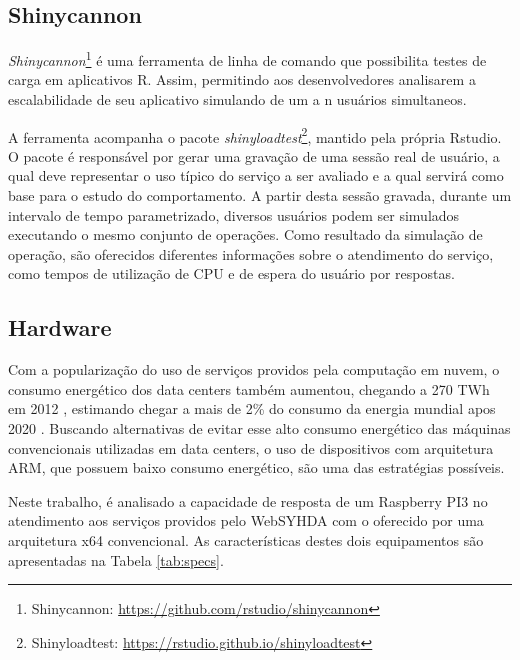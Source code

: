 \documentclass[12pt,english,brazil]{article}
\begin{document}
\subsection{Shinycannon} \label{sec:Shinycannon}

\textit{Shinycannon}\footnote{Shinycannon: \url{https://github.com/rstudio/shinycannon}} é uma ferramenta de linha de comando que possibilita testes de carga em aplicativos R. Assim, permitindo aos desenvolvedores analisarem a escalabilidade de seu aplicativo simulando de um a n usuários simultaneos.

A ferramenta acompanha o pacote \textit{shinyloadtest}\footnote{Shinyloadtest: \url{https://rstudio.github.io/shinyloadtest}}, mantido pela própria Rstudio. O pacote é responsável por gerar uma gravação de uma sessão real de usuário, a qual deve representar o uso típico do serviço a ser avaliado\cite{shinyloadtest} e a qual servirá como base para o estudo do comportamento. A partir desta sessão gravada, durante um intervalo de tempo parametrizado, diversos usuários podem ser simulados executando o mesmo conjunto de operações. Como resultado da simulação de operação, são oferecidos diferentes informações sobre o atendimento do serviço, como tempos de utilização de CPU e de espera do usuário por respostas.

\subsection{Hardware}\label{sec:Hardware}
Com a popularização do uso de serviços providos pela computação em nuvem, o consumo energético dos data centers também aumentou, chegando a 270 TWh em 2012 \cite{VanHeddeghem:2014:TWI:2657027.2657141}, estimando chegar a mais de 2\% do consumo da energia mundial apos 2020 \cite{energy}. Buscando alternativas de evitar esse alto consumo energético das máquinas convencionais utilizadas em data centers, o uso de dispositivos com arquitetura ARM, que possuem baixo consumo energético, são uma das estratégias possíveis.

Neste trabalho, é analisado a capacidade de resposta de um Raspberry PI3 no atendimento aos serviços providos pelo WebSYHDA com o oferecido por uma arquitetura x64 convencional. As características destes dois equipamentos são apresentadas na Tabela \ref{tab:specs}. 
\end{document}

